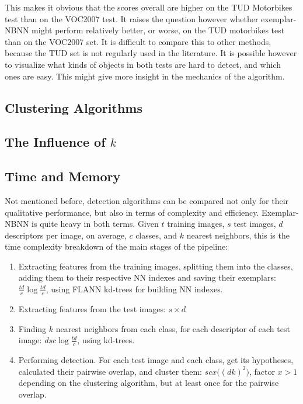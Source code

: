 This makes it obvious that the scores overall are higher on the TUD Motorbikes test than on the VOC2007 test. It raises the question however whether exemplar-NBNN might perform relatively better, or worse, on the TUD motorbikes test than on the VOC2007 set. It is difficult to compare this to other methods, because the TUD set is not regularly used in the literature. It is possible however to visualize what kinds of objects in both tests are hard to detect, and which ones are easy. This might give more insight in the mechanics of the algorithm.



\subsection{Clustering Algorithms} %
\label{sub:anal_clustering_algorithms}




\subsection{The Influence of $k$} %
\label{sub:the_influence_of_k_}


\subsection{Time and Memory} %
\label{sub:time_and_memory_constraints}

Not mentioned before, detection algorithms can be compared not only for their qualitative performance, but also in terms of complexity and efficiency. Exemplar-NBNN is quite heavy in both terms. Given $t$ training images, $s$ test images, $d$ descriptors per image, on average, $c$ classes, and $k$ nearest neighbors, this is the time complexity breakdown of the main stages of the pipeline:
\begin{enumerate}
    \item Extracting features from the training images, splitting them into the classes, adding them to their respective NN indexes and saving their exemplars: $\frac{td}{c} \log \frac{td}{c}$, using FLANN kd-trees for building NN indexes.
    \item Extracting features from the test images: $s\times d$
    \item Finding $k$ nearest neighbors from each class, for each descriptor of each test image: $d s c \log \frac{td}{c} $, using kd-trees.
    \item Performing detection. For each test image and each class, get its hypotheses, calculated their pairwise overlap, and cluster them: $s c x\big((d k)^2\big)$, factor $x>1$ depending on the clustering algorithm, but at least once for the pairwise overlap.
\end{enumerate}

